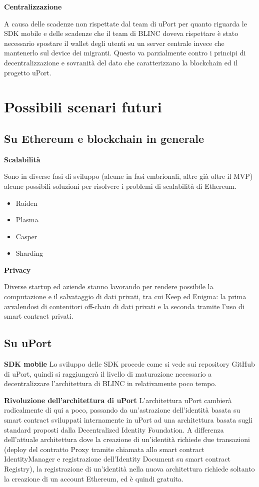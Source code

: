 \textbf{Centralizzazione}

A causa delle scadenze non rispettate dal team di uPort per quanto riguarda le SDK mobile e delle scadenze
che il team di BLINC doveva rispettare è stato necessario spostare il wallet degli utenti su un server centrale
invece che mantenerlo sul device dei migranti. Questo va parzialmente contro i principi di decentralizzazione
e sovranità del dato che caratterizzano la blockchain ed il progetto uPort.

\section{Possibili scenari futuri}

\subsection{Su Ethereum e blockchain in generale}

\textbf{Scalabilità}

Sono in diverse fasi di sviluppo (alcune in fasi embrionali, altre già oltre il MVP)
alcune possibili soluzioni per risolvere i problemi di scalabilità di Ethereum.

\begin{itemize}
  \item Raiden
  \item Plasma
  \item Casper
  \item Sharding
\end{itemize}

\textbf{Privacy}

Diverse startup ed aziende stanno lavorando per rendere possibile la computazione
e il salvataggio di dati privati, tra cui Keep ed Enigma: la prima avvalendosi di contenitori
off-chain di dati privati e la seconda tramite l’uso di smart contract privati.

\subsection{Su uPort}

\textbf{SDK mobile}
Lo sviluppo delle SDK procede come si vede sui repository GitHub di uPort,
quindi si raggiungerà il livello di maturazione necessario a decentralizzare
l’architettura di BLINC in relativamente poco tempo.

\textbf{Rivoluzione dell'architettura di uPort}
L’architettura uPort cambierà radicalmente di qui a poco, passando da un’astrazione
dell’identità basata su smart contract sviluppati internamente in uPort ad una architettura
basata sugli standard proposti dalla Decentralized Identity Foundation.
A differenza dell’attuale architettura dove la creazione di un’identità richiede
due transazioni (deploy del contratto Proxy tramite chiamata allo smart contract  IdentityManager
e registrazione dell’Identity Document su smart contract Registry), la registrazione
di un’identità nella nuova architettura richiede soltanto
la creazione di un account Ethereum, ed è quindi gratuita.


